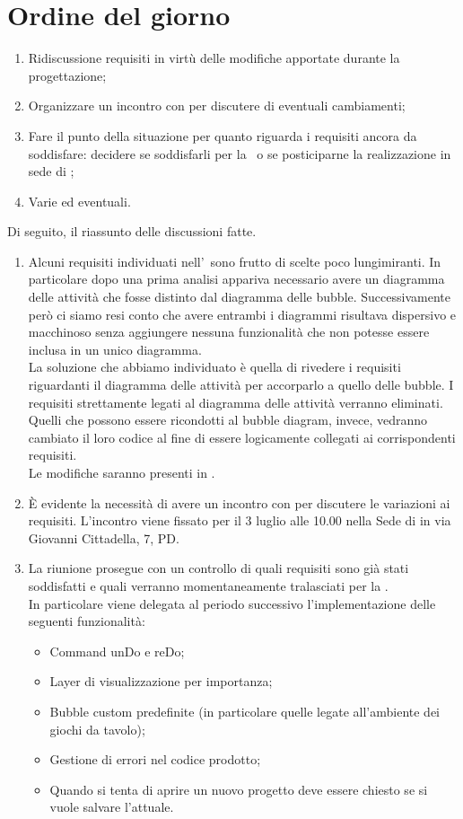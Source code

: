 \documentclass[../AnalisiDeiRequisiti.tex]{subfiles}
\begin{document}
	\section*{Ordine del giorno}
		\begin{enumerate}
			\item Ridiscussione requisiti in virtù delle modifiche apportate durante la progettazione;
			\item Organizzare un incontro con \proponente per discutere di eventuali cambiamenti;
			\item Fare il punto della situazione per quanto riguarda i requisiti ancora da soddisfare: decidere se soddisfarli per la \revisionediqualifica\ o se posticiparne la realizzazione in sede di \revisionediaccettazione;
			\item Varie ed eventuali.
		\end{enumerate}
		Di seguito, il riassunto delle discussioni fatte.
		\begin{enumerate}
		\item Alcuni requisiti individuati nell'\analisideirequisiti\ sono frutto di scelte poco lungimiranti. In particolare dopo una prima analisi appariva necessario avere un diagramma delle attività che fosse distinto dal diagramma delle bubble. Successivamente però ci siamo resi conto che avere entrambi i diagrammi risultava dispersivo e macchinoso senza aggiungere nessuna funzionalità che non potesse essere inclusa in un unico diagramma. \\La soluzione che abbiamo individuato è quella di rivedere i requisiti riguardanti il diagramma delle attività per accorparlo a quello delle bubble. I requisiti strettamente legati al diagramma delle attività verranno eliminati. Quelli che possono essere ricondotti al bubble diagram, invece, vedranno cambiato il loro codice al fine di essere logicamente collegati ai corrispondenti requisiti.\\
		Le modifiche saranno presenti in \analisideirequisitiv.
		\item È evidente la necessità di avere un incontro con \proponente per discutere le variazioni ai requisiti. L'incontro viene fissato per il 3 luglio alle 10.00 nella Sede di \proponente in via Giovanni Cittadella, 7, PD.
		\item La riunione prosegue con un controllo di quali requisiti sono già stati soddisfatti e quali verranno momentaneamente tralasciati per la \revisionediqualifica.\\
		In particolare viene delegata al periodo successivo l'implementazione delle seguenti funzionalità:
		\begin{itemize}
			\item Command unDo e reDo;
			\item Layer di visualizzazione per importanza;
			\item Bubble custom predefinite (in particolare quelle legate all'ambiente dei giochi da tavolo);
			\item Gestione di errori nel codice prodotto;
			\item Quando si tenta di aprire un nuovo progetto deve essere chiesto se si vuole salvare l'attuale.
		\end{itemize}
		\end{enumerate}
\end{document}
